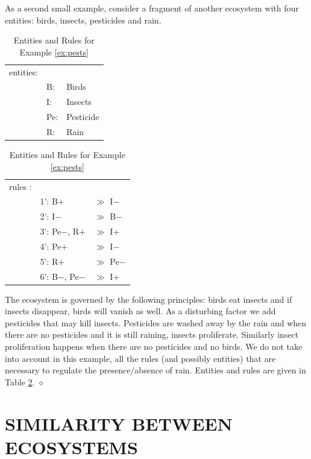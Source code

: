 \documentclass[a4paper,twoside]{article}
\begin{document}
\begin{example}[Pesticides]\label{ex:pests}
As a second small example, consider a fragment of another ecosystem with four entities: birds, insects, pesticides and rain.

\begin{table}
\centering
\begin{tabular}{lll}
entities:&&\\
    &B: &Birds \\
    &I: &Insects \\
    &Pe: &Pesticide \\
    &R: &Rain \\
\end{tabular} \qquad
\begin{tabular}{lll}
rules :&&\\
    &1': B+ & $\gg$  I$-$  \\
    &2': I$-$ & $\gg$ B$-$ \\
    &3': Pe$-$, R+  & $\gg$ I+ \\
    &4': Pe+ & $\gg$ I$-$ \\
    &5': R+ & $\gg$ Pe$-$ \\
    &6': B$-$, Pe$-$ & $\gg$ I+ 
\end{tabular}
\caption{Entities and Rules for Example \ref{ex:pests}}\label{tab:pest}
\end{table}
The ecosystem is governed by the following principles: birds eat insects and if insects disappear, birds will vanish as well. As a disturbing factor we add pesticides that may kill insects. 
Pesticides are washed away by the rain and when there are no pesticides and it is still raining, insects proliferate. Similarly insect proliferation happens when there are no pesticides and no birds. 
We do not take into account in this example, all the rules (and possibly entities) that are necessary to regulate the presence/absence of rain.
Entities and rules are given in Table \ref{tab:pest}.
\hfill $\diamond$
\end{example}


\section{\uppercase{Similarity between ecosystems}}
\label{sec:similarity}
\end{document}
